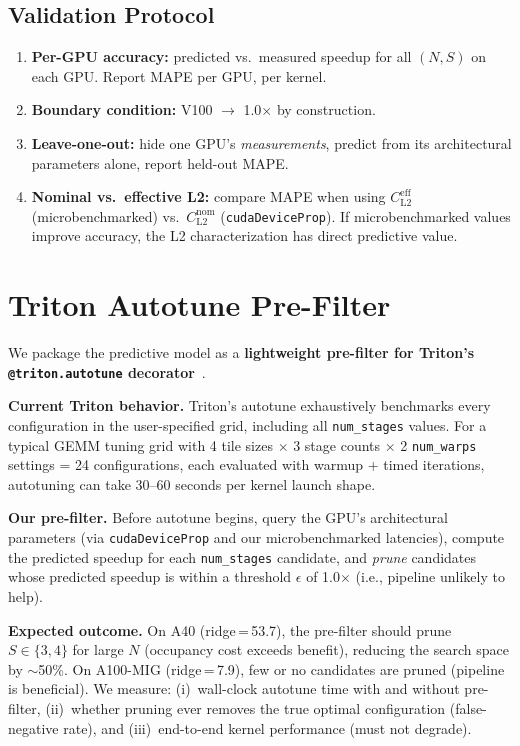 \documentclass[sigplan,nonacm,10pt]{acmart}
\begin{document}
\subsection{Validation Protocol}

\begin{enumerate}
\item \textbf{Per-GPU accuracy:} predicted vs.\ measured speedup for
  all $(N, S)$ on each GPU.  Report MAPE per GPU, per kernel.
\item \textbf{Boundary condition:} V100 $\to$ 1.0$\times$ by
  construction.
\item \textbf{Leave-one-out:} hide one GPU's \emph{measurements},
  predict from its architectural parameters alone, report held-out MAPE.
\item \textbf{Nominal vs.\ effective L2:} compare MAPE when using
  $C_{\text{L2}}^{\text{eff}}$ (microbenchmarked) vs.\
  $C_{\text{L2}}^{\text{nom}}$ (\texttt{cudaDeviceProp}).
  If microbenchmarked values improve accuracy, the L2 characterization
  has direct predictive value.
\end{enumerate}

\section{Triton Autotune Pre-Filter}
\label{sec:triton}

We package the predictive model as a \textbf{lightweight pre-filter for
Triton's \texttt{@triton.autotune} decorator}~\cite{triton}.

\textbf{Current Triton behavior.}
Triton's autotune exhaustively benchmarks every configuration in the
user-specified grid, including all \texttt{num\_stages} values.
For a typical GEMM tuning grid with 4 tile sizes $\times$ 3 stage
counts $\times$ 2 \texttt{num\_warps} settings = 24 configurations,
each evaluated with warmup + timed iterations, autotuning can take
30--60 seconds per kernel launch shape.

\textbf{Our pre-filter.}
Before autotune begins, query the GPU's architectural parameters
(via \texttt{cudaDeviceProp} and our microbenchmarked latencies),
compute the predicted speedup for each \texttt{num\_stages} candidate,
and \emph{prune} candidates whose predicted speedup is within a
threshold $\epsilon$ of 1.0$\times$ (i.e., pipeline unlikely to help).

\textbf{Expected outcome.}
On A40 (ridge\,=\,53.7), the pre-filter should prune $S \in \{3, 4\}$
for large $N$ (occupancy cost exceeds benefit), reducing the search
space by $\sim$50\%.
On A100-MIG (ridge\,=\,7.9), few or no candidates are pruned (pipeline
is beneficial).
We measure:
(i)~wall-clock autotune time with and without pre-filter,
(ii)~whether pruning ever removes the true optimal configuration
(false-negative rate), and
(iii)~end-to-end kernel performance (must not degrade).
\end{document}
